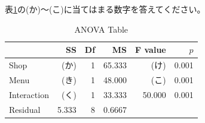 \documentclass{ltjbook}
\begin{document}
表\ref{Example2Ans}の(か)〜(こ)に当てはまる数字を答えてください。

\begin{table}[ht]
  \centering
  \caption{ANOVA Table} 
  \begin{tabular}{lrrrrr}
    \hline
   & SS & Df & MS & F value & $p$ \\ 
    \hline
  Shop      & (か) & 1 & 65.333 & (け) & 0.001\\ 
  Menu      & (き) & 1 & 48.000 & (こ) & 0.001 \\ 
Interaction & (く) & 1 & 33.333 & 50.000 & 0.001 \\ 
  Residual  & 5.333 & 8 & 0.6667 &  &  \\ 
     \hline
  \end{tabular}
    \label{Example2Ans}
  \end{table}
\end{document}
